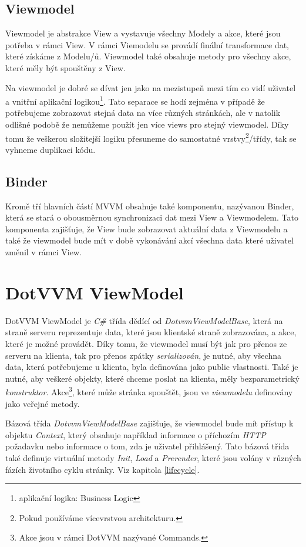 \subsection*{Viewmodel}
Viewmodel je abstrakce View a vystavuje všechny Modely a akce, které jsou potřeba v rámci View. V rámci Viemodelu se provádí finální transformace dat, které získáme z Modelu/ů. Viewmodel také obsahuje metody pro všechny akce, které měly být spouštěny z View.

Na viewmodel je dobré se dívat jen jako na mezistupeň mezi tím co vidí uživatel a vnitřní aplikační logikou\footnote{aplikační logika: Business Logic}. Tato separace se hodí zejména v případě že potřebujeme zobrazovat stejná data na více různých stránkách, ale v natolik odlišné podobě že nemůžeme použít jen více views pro stejný viewmodel. Díky tomu že veškerou složitejší logiku přesuneme do samostatné vrstvy\footnote{Pokud používáme vícevrstvou architekturu.}/třídy, tak se vyhneme duplikaci kódu.
\subsection*{Binder}
Kromě tří hlavních částí MVVM obsahuje také komponentu, nazývanou Binder, která se stará o obousměrnou synchronizaci dat mezi View a Viewmodelem. Tato komponenta zajišťuje, že View bude zobrazovat aktuální data z Viewmodelu a také že viewmodel bude mít v době vykonávání akcí všechna data které uživatel změnil v rámci View.

\section{DotVVM ViewModel}

DotVVM ViewModel je \emph{C\#} třída dědící od \emph{DotvvmViewModelBase}, která na straně serveru reprezentuje data, které jsou klientské straně zobrazována, a akce, které je možné provádět.
Díky tomu, že viewmodel musí být jak pro přenos ze serveru na klienta, tak pro přenos zpátky \emph{serializován}, je nutné, aby všechna data, která potřebujeme u klienta, byla definována jako public vlastnosti. Také je nutné, aby veškeré objekty, které chceme poslat na klienta, měly bezparametrický \emph{konstruktor}.
Akce\footnote{Akce jsou v rámci DotVVM nazývané Commands.\cite{DotVVM-VM}}, které může stránka spouštět, jsou ve \emph{viewmodelu} definovány jako veřejné metody.

Bázová třída \emph{DotvvmViewModelBase} zajišťuje, že viewmodel bude mít přístup k objektu \emph{Context}, který obsahuje například informace o příchozím \emph{HTTP} požadavku nebo informace o tom, zda je uživatel přihlášený.
Tato bázová třída také definuje virtuální metody \emph{Init}, \emph{Load} a \emph{Prerender}, které jsou volány v různých fázích životního cyklu stránky. Viz kapitola \ref{lifecycle}.


